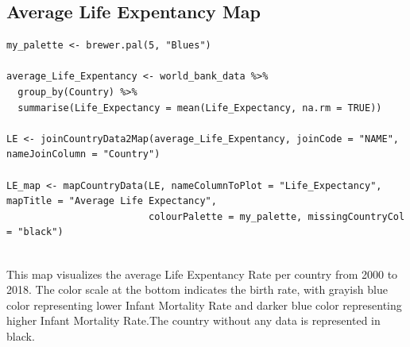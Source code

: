 \documentclass{article}\usepackage[]{graphicx}\usepackage[]{xcolor}
\begin{document}
\newpage
\subsection{Average Life Expentancy Map}
\begin{lstlisting}
my_palette <- brewer.pal(5, "Blues")

average_Life_Expentancy <- world_bank_data %>%
  group_by(Country) %>%
  summarise(Life_Expectancy = mean(Life_Expectancy, na.rm = TRUE))

LE <- joinCountryData2Map(average_Life_Expentancy, joinCode = "NAME", nameJoinColumn = "Country")

LE_map <- mapCountryData(LE, nameColumnToPlot = "Life_Expectancy", mapTitle = "Average Life Expectancy", 
                         colourPalette = my_palette, missingCountryCol = "black")


\end{lstlisting}
This map visualizes the average Life Expentancy Rate per country from 2000 to 2018. The color scale at the bottom indicates the birth rate, with grayish blue  color representing lower Infant Mortality Rate and darker blue color representing higher Infant Mortality Rate.The country without any data is represented in black.
\newpage
\end{document}
